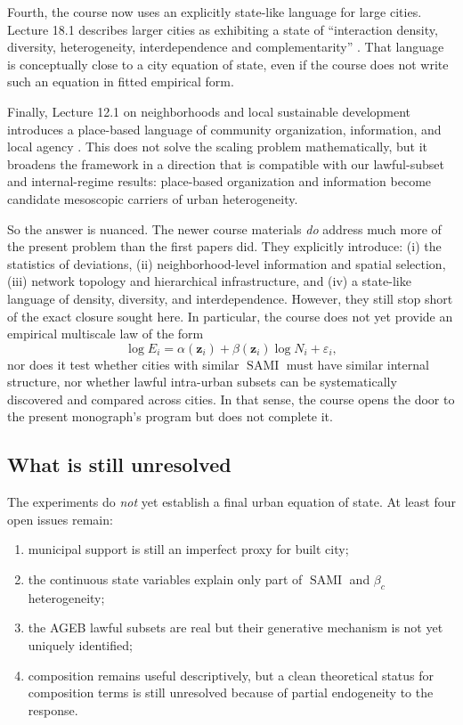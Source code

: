 \documentclass[11pt]{article}
\newcommand{\SAMI}{\operatorname{SAMI}}
\begin{document}
Fourth, the course now uses an explicitly state-like language for large cities. Lecture 18.1 describes larger cities as exhibiting a state of ``interaction density, diversity, heterogeneity, interdependence and complementarity'' \citep{bettencourtlecture18_2024}. That language is conceptually close to a city equation of state, even if the course does not write such an equation in fitted empirical form.

Finally, Lecture 12.1 on neighborhoods and local sustainable development introduces a place-based language of community organization, information, and local agency \citep{bettencourtlecture12_2024}. This does not solve the scaling problem mathematically, but it broadens the framework in a direction that is compatible with our lawful-subset and internal-regime results: place-based organization and information become candidate mesoscopic carriers of urban heterogeneity.

So the answer is nuanced. The newer course materials \emph{do} address much more of the present problem than the first papers did. They explicitly introduce: (i) the statistics of deviations, (ii) neighborhood-level information and spatial selection, (iii) network topology and hierarchical infrastructure, and (iv) a state-like language of density, diversity, and interdependence. However, they still stop short of the exact closure sought here. In particular, the course does not yet provide an empirical multiscale law of the form
\begin{equation}
\log E_i
=
\alpha(\mathbf{z}_i)+\beta(\mathbf{z}_i)\log N_i+\varepsilon_i,
\end{equation}
nor does it test whether cities with similar \(\SAMI\) must have similar internal structure, nor whether lawful intra-urban subsets can be systematically discovered and compared across cities. In that sense, the course opens the door to the present monograph's program but does not complete it.

\subsection{What is still unresolved}

The experiments do \emph{not} yet establish a final urban equation of state. At least four open issues remain:
\begin{enumerate}[label=\arabic*.,leftmargin=2.0em]
\item municipal support is still an imperfect proxy for built city;
\item the continuous state variables explain only part of \(\SAMI\) and \(\beta_c\) heterogeneity;
\item the AGEB lawful subsets are real but their generative mechanism is not yet uniquely identified;
\item composition remains useful descriptively, but a clean theoretical status for composition terms is still unresolved because of partial endogeneity to the response.
\end{enumerate}
\end{document}
